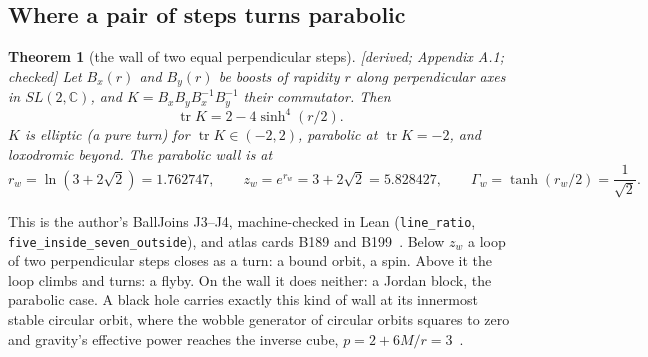 \documentclass[11pt]{article}
\newtheorem{theorem}{Theorem}\newtheorem{proposition}[theorem]{Proposition}\newtheorem{lemma}[theorem]{Lemma}
\theoremstyle{definition}\newtheorem{hypothesis}{Hypothesis}\newtheorem{prediction}{Prediction}
\theoremstyle{remark}\newtheorem{remark}[theorem]{Remark}
\newcommand{\grade}[1]{\textsf{\small[#1]}}
\begin{document}
\subsection{Where a pair of steps turns parabolic}
\begin{theorem}[the wall of two equal perpendicular steps]\label{thm:wall}\grade{derived; Appendix A.1; checked}
Let $B_x(r)$ and $B_y(r)$ be boosts of rapidity $r$ along perpendicular axes in $SL(2,\mathbb C)$, and $K=B_xB_yB_x^{-1}B_y^{-1}$ their commutator. Then
\begin{equation}
\operatorname{tr}K=2-4\sinh^4(r/2).
\end{equation}
$K$ is elliptic (a pure turn) for $\operatorname{tr}K\in(-2,2)$, parabolic at $\operatorname{tr}K=-2$, and loxodromic beyond. The parabolic wall is at
\begin{equation}
r_w=\ln(3+2\sqrt2)=1.762747,\qquad z_w=e^{r_w}=3+2\sqrt2=5.828427,\qquad \Gamma_w=\tanh(r_w/2)=\frac1{\sqrt2}.
\end{equation}
\end{theorem}
This is the author's BallJoins J3--J4, machine-checked in Lean (\texttt{line\_ratio}, \texttt{five\_inside\_seven\_outside}), and atlas cards B189 and B199~\cite{TwoTrees,Atlas,SMball}. Below $z_w$ a loop of two perpendicular steps closes as a turn: a bound orbit, a spin. Above it the loop climbs and turns: a flyby. On the wall it does neither: a Jordan block, the parabolic case. A black hole carries exactly this kind of wall at its innermost stable circular orbit, where the wobble generator of circular orbits squares to zero and gravity's effective power reaches the inverse cube, $p=2+6M/r=3$~\cite{BH}.
\end{document}
